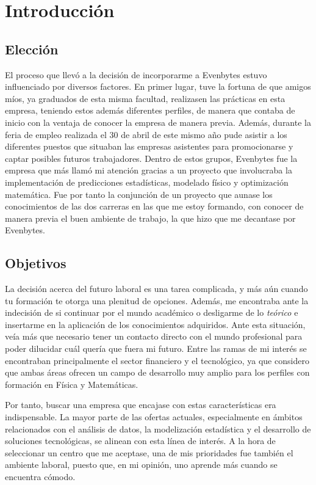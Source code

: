 \chapter{Introducción}
%
%
%
\section{Elección} \label{eleccion}
%
%
El proceso que llevó a la decisión de incorporarme a Evenbytes estuvo influenciado por diversos factores. En primer lugar, tuve la fortuna de que amigos míos, ya graduados de esta misma facultad, realizasen las prácticas en esta empresa, teniendo estos además diferentes perfiles, de manera que contaba de inicio con la ventaja de conocer la empresa de manera previa. Además, durante la feria de empleo realizada el 30 de abril de este mismo año pude asistir a los diferentes puestos que situaban las empresas asistentes para promocionarse y captar posibles futuros trabajadores. Dentro de estos grupos, Evenbytes fue la empresa que más llamó mi atención gracias a un proyecto que involucraba la implementación de predicciones estadísticas, modelado físico y optimización matemática. Fue por tanto la conjunción de un proyecto que aunase los conocimientos de las dos carreras en las que me estoy formando, con conocer de manera previa el buen ambiente de trabajo, la que hizo que me decantase por Evenbytes.
%
%
\section{Objetivos} \label{objetivos}
%
%
La decisión acerca del futuro laboral es una tarea complicada, y más aún cuando tu formación te otorga una plenitud de opciones. Además, me encontraba ante la indecisión de si continuar por el mundo académico o desligarme de lo \textit{teórico} e insertarme en la aplicación de los conocimientos adquiridos. Ante esta situación, veía más que necesario tener un contacto directo con el mundo profesional para poder dilucidar cuál quería que fuera mi futuro. Entre las ramas de mi interés se encontraban principalmente el sector financiero y el tecnológico, ya que considero que ambas áreas ofrecen un campo de desarrollo muy amplio para los perfiles con formación en Física y Matemáticas.

Por tanto, buscar una empresa que encajase con estas características era indispensable. La mayor parte de las ofertas actuales, especialmente en ámbitos relacionados con el análisis de datos, la modelización estadística y el desarrollo de soluciones tecnológicas, se alinean con esta línea de interés. A la hora de seleccionar un centro que me aceptase, una de mis prioridades fue también el ambiente laboral, puesto que, en mi opinión, uno aprende más cuando se encuentra cómodo.

